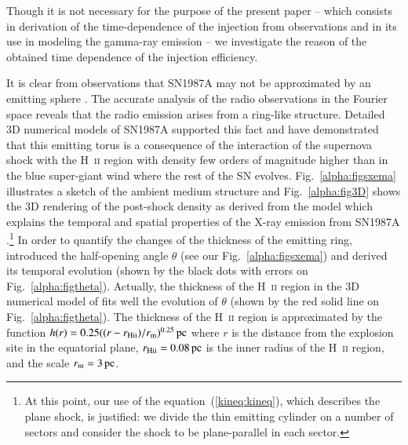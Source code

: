 \documentclass{aa}
\newcommand\un[1]{{\,\rm #1}}
\newcommand\rs[1]{_\mathrm{#1}}
\begin{document}
Though it is not necessary for the purpose of the present paper -- which consists in derivation of the time-dependence of the injection from observations and in its use in modeling the gamma-ray emission -- we investigate the reason of the obtained time dependence of the injection efficiency.

It is clear from observations that SN1987A may not be approximated by an emitting sphere \citep[e.g.][]{ng-etal-2013,zanardo-etal-2013}. The accurate analysis of the radio observations in the Fourier space \citep{ng-etal-2008,ng-etal-2013} reveals that the radio emission arises from a ring-like structure. Detailed 3D numerical models of SN1987A \citep{potter-etal-2014,orlando-etal-2015} supported this fact and have demonstrated that this emitting torus is a consequence of the interaction of the supernova shock with the H~\textsc{ii} region with density few orders of magnitude higher than in the blue super-giant wind where the rest of the SN evolves. Fig.~\ref{alpha:figsxema} illustrates a sketch of the ambient medium structure and Fig.~\ref{alpha:fig3D} shows the 3D rendering of the post-shock density as derived from the model which explains the temporal and spatial properties of the X-ray emission from SN1987A \citep{orlando-etal-2015}.\footnote{At this point, our use of the equation~(\ref{kineq:kineq}), which describes the plane shock, is justified: we divide the thin emitting cylinder on a number of sectors and consider the shock to be plane-parallel in each sector.} In order to quantify the changes of the thickness of the emitting ring, \citet{ng-etal-2008,ng-etal-2013} introduced the half-opening angle $\theta$ (see our Fig.~\ref{alpha:figsxema}) and derived its temporal evolution (shown by the black dots with errors on Fig.~\ref{alpha:figtheta}). Actually, the thickness of the H~\textsc{ii} region in the 3D numerical model of \citet{orlando-etal-2015} fits well the evolution of $\theta$ (shown by the red solid line on Fig.~\ref{alpha:figtheta}). The thickness of the H~\textsc{ii} region is approximated by the function $h(r)= 0.25((r-r\rs{Hii})/r\rs{m})^{0.25}\un{pc}$ where $r$ is the distance from the explosion site in the equatorial plane, $r\rs{Hii}=0.08\un{pc}$ is the inner radius of the H~\textsc{ii} region, and the scale $r\rs{m}=3\un{pc}$.
\end{document}
